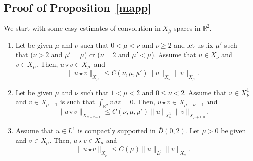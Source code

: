 \documentclass[AHL,Unicode,longabstracts,published]{cedram}
\newcommand*\R{\mathbb R}
\newcommand*\gs{\geqslant }
\newcommand*\ls{\leqslant }
\newcommand*{\romanenumi}{\renewcommand*{\theenumi}{\roman{enumi}}}
\begin{document}
\subsection{Proof of Proposition~\ref{mapp}}

We start with some easy estimates of convolution in $X_\beta $ spaces in $ \R^2 $.
\pagebreak

\begin{lemm}\label{decay}\leavevmode
\begin{enumerate}\romanenumi
\item\label{lemm4.1.1} Let be given $ \mu $ and $ \nu $ such that $ 0 < \mu < \nu $ and $ \nu \gs 2 $ and let us fix $ \mu' $ such that ($ \nu > 2 $ and $ \mu' = \mu $) or ($ \nu = 2 $ and $ \mu' < \mu $). Assume that $ u \in X_\nu $ and $ v \in X_\mu $. Then, $ u \star v \in X_{\mu'} $ and
\[
\| u \star v \|_{ X_{\mu'} } \ls C(\nu, \mu, \mu') \| u \|_{ X_{\nu} } \| v \|_{ X_{\mu} }.
\]
\item\label{lemm4.1.2} Let be given $ \mu $ and $ \nu $ such that $ 1 < \mu < 2 $ and $ 0 \ls \nu < 2 $. Assume that $ u \in X^1_\nu $ and $ v \in X_{\mu+1} $ is such that $ \int_{\R^2 } v \, dz = 0 $. Then, $ u \star v \in X_{\mu + \nu - 1 } $ and
\[
\| u \star v \|_{ X_{\mu + \nu -1 } } \ls C(\nu, \mu, \mu') \| u \|_{ X^1_{\nu} } \| v \|_{ X_{\mu +1, 0} }.
\]
\item\label{lemm4.1.3} Assume that $ u \in L^1 $ is compactly supported in $ \bar{D}(0, 2) $. Let $ \mu > 0 $ be given and $ v \in X_\mu $. Then, $ u \star v \in X_{\mu} $ and
\[
\| u \star v \|_{ X_{\mu} } \ls C(\mu) \| u \|_{ L^1 } \| v \|_{ X_{\mu} }.
\]
\end{enumerate}
\end{lemm}
\end{document}
